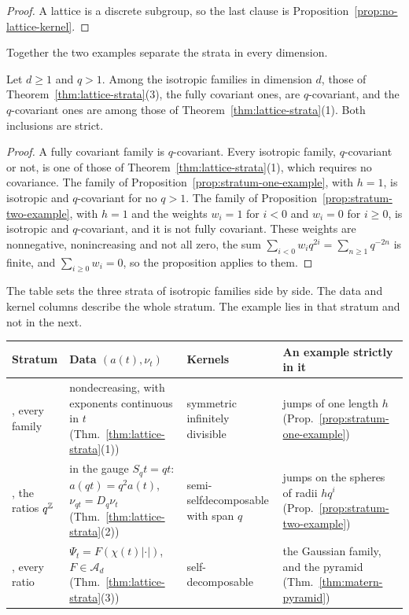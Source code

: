 \begin{proof}
A lattice is a discrete subgroup, so the last clause is Proposition~\ref{prop:no-lattice-kernel}.
\end{proof}

Together the two examples separate the strata in every dimension.

\begin{theorem}
\label{thm:lattice-strata-strict}

Let $d \ge 1$ and $q > 1$. Among the isotropic families in dimension $d$, those of
Theorem~\ref{thm:lattice-strata}(3), the fully covariant ones, are $q$-covariant, and the
$q$-covariant ones are among those of Theorem~\ref{thm:lattice-strata}(1). Both inclusions are
strict.
\end{theorem}

\begin{proof}
A fully covariant family is $q$-covariant. Every isotropic family, $q$-covariant or not, is one of
those of Theorem~\ref{thm:lattice-strata}(1), which requires no covariance. The family of
Proposition~\ref{prop:stratum-one-example}, with $h = 1$, is isotropic and $q$-covariant for no
$q > 1$. The family of Proposition~\ref{prop:stratum-two-example}, with $h = 1$ and the weights
$w_i = 1$ for $i < 0$ and $w_i = 0$ for $i \ge 0$, is isotropic and $q$-covariant, and it is not
fully covariant. These weights are nonnegative, nonincreasing and not all zero, the sum
$\sum_{i<0}w_iq^{2i} = \sum_{n\ge1}q^{-2n}$ is finite, and $\sum_{i\ge0}w_i = 0$, so the
proposition applies to them.
\end{proof}

The table sets the three strata of isotropic families side by side. The data and kernel columns
describe the whole stratum. The example lies in that stratum and not in the next.

\begin{center}
\small
\begin{tabular}{>{\raggedright\arraybackslash}p{}>{\raggedright\arraybackslash}p{}>{\raggedright\arraybackslash}p{}>{\raggedright\arraybackslash}p{}}
\toprule
Stratum & Data $(a(t), \nu_t)$ & Kernels & An example strictly in it \\
\midrule
1, every family & nondecreasing, with exponents continuous in $t$ (Thm.~\ref{thm:lattice-strata}(1)) &
symmetric infinitely divisible & jumps of one length $h$ (Prop.~\ref{prop:stratum-one-example}) \\
2, the ratios $q^{\mathbb{Z}}$ & in the gauge $S_qt = qt$: $a(qt) = q^2a(t)$, $\nu_{qt} = D_q\nu_t$
(Thm.~\ref{thm:lattice-strata}(2)) & semi-selfdecomposable with span $q$ & jumps on the spheres of
radii $hq^i$ (Prop.~\ref{prop:stratum-two-example}) \\
3, every ratio & $\Psi_t = F(\chi(t)|\cdot|)$, $F \in \mathcal{A}_d$ (Thm.~\ref{thm:lattice-strata}(3)) &
self-decomposable & the Gaussian family, and the \Matern{} pyramid (Thm.~\ref{thm:matern-pyramid}) \\
\bottomrule
\end{tabular}
\end{center}

